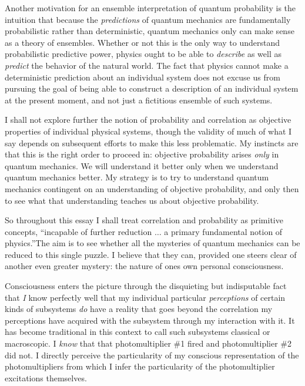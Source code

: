 Another motivation for an ensemble interpretation of quantum
probability is the intuition that because the {\it predictions\/} of
quantum mechanics are fundamentally probabilistic rather than
deterministic, quantum mechanics only can make sense as a theory of
ensembles.  Whether or not this is the only way to understand
probabilistic predictive power, physics ought to be able to {\it
describe\/} as well as {\it predict\/} the behavior of the natural
world.  The fact that physics cannot make a deterministic prediction
about an individual system does not excuse us from pursuing the goal
of being able to construct a description of an individual system at
the present moment, and not just a fictitious ensemble of such systems.

I shall not explore further the notion of probability and correlation
as objective properties of individual physical systems, though the
validity of much of what I say depends on subsequent efforts to make
this less problematic.  My instincts are that this is the right order
to proceed in: objective probability arises {\it only\/} in quantum
mechanics.  We will understand it better only when we understand
quantum mechanics better.  My strategy is to try to understand quantum
mechanics contingent on an understanding of objective probability, and
only then to see what that understanding teaches us about objective
probability.\fn  

So throughout this essay I shall treat correlation and probability as
primitive concepts, ``incapable of further reduction $\ldots$ a
primary fundamental notion of physics.''\fn The aim is to
see whether all the mysteries of quantum mechanics can be reduced to
this single puzzle.  I believe that they can, provided one steers
clear of another even greater mystery: the nature of ones own personal
consciousness.  

\bigskip{}\nobreak Consciousness
enters the picture through the disquieting but indisputable fact that
{\it I\/} know perfectly well that my individual particular {\it
perceptions\/} of certain kinds of subsystems {\it do\/} have a
reality that goes beyond the correlation my perceptions have acquired
with the subsystem through my interaction with it.  It has become
traditional in this context to call such subsystems classical or
macroscopic.  I {\it know\/} that that photomultiplier
\#1 fired and photomultiplier \#2 did not.  I directly perceive the
particularity of my conscious representation of the photomultipliers
from which I infer the particularity of the photomultiplier
excitations themselves.  

